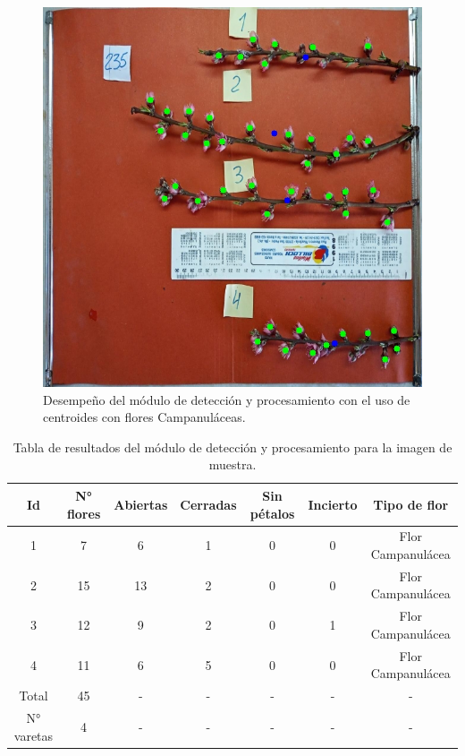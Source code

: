 \begin{figure}[ht]
	\centering
	\includegraphics[scale=0.5]{./Figures/centroids3.jpeg}
	\caption{Desempeño del módulo de detección y procesamiento con el uso de centroides con flores Campanuláceas.}
	\label{fig:DesempeñoMod2}
\end{figure}
\newpage

\begin{table}[h]
	\centering
	\caption{Tabla de resultados del módulo de detección y procesamiento para la imagen de muestra.}
	\begin{tabular}{c c c c c c c}    
		\toprule
		\textbf{Id}&\textbf{N° flores}&\textbf{Abiertas}&\textbf{Cerradas}&\textbf{Sin pétalos}&\textbf{Incierto} &\textbf{Tipo de flor}\\
		\midrule
		1 & 7 & 6 & 1 & 0 & 0 & Flor Campanulácea\\
		2 & 15 & 13 & 2 & 0 & 0 & Flor Campanulácea\\
		3 & 12 & 9 & 2 & 0 & 1 & Flor Campanulácea\\
		4 & 11 & 6 & 5 & 0 & 0 & Flor Campanulácea\\
		Total & 45 & - & - & - & - & - \\
		N° varetas & 4 & - & - & - & - & - \\
		\bottomrule
		\hline
	\end{tabular}
	\label{tab:resultadosmod2}
\end{table}


